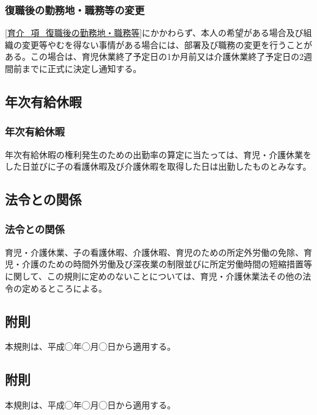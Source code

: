 \documentclass{jsarticle}
\begin{document}
\subsubsection{復職後の勤務地・職務等の変更}
\label{育介_項_復職後の勤務地・職務等の変更}
\ref{育介_項_復職後の勤務地・職務等}にかかわらず、本人の希望がある場合及び組織の変更等やむを得ない事情がある場合には、部署及び職務の変更を行うことがある。この場合は、育児休業終了予定日の1か月前又は介護休業終了予定日の2週間前までに正式に決定し通知する。

\subsection{年次有給休暇}
\label{育介_条_年次有給休暇}

\subsubsection{年次有給休暇}
\label{育介_項_年次有給休暇}
年次有給休暇の権利発生のための出勤率の算定に当たっては、育児・介護休業をした日並びに子の看護休暇及び介護休暇を取得した日は出勤したものとみなす。

\subsection{法令との関係}
\label{育介_条_法令との関係}

\subsubsection{法令との関係}
\label{育介_項_法令との関係}
育児・介護休業、子の看護休暇、介護休暇、育児のための所定外労働の免除、育児・介護のための時間外労働及び深夜業の制限並びに所定労働時間の短縮措置等に関して、この規則に定めのないことについては、育児・介護休業法その他の法令の定めるところによる。

\fusoku{}
\subsection{附則}
本規則は、平成◯年◯月◯日から適用する。

\subsection{附則}
本規則は、平成◯年◯月◯日から適用する。
\end{document}
